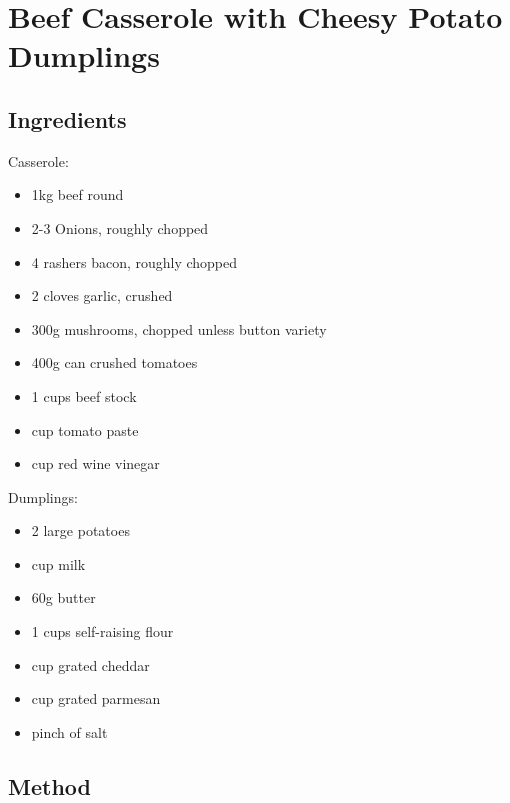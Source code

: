 \clearpage
\section{Beef Casserole with Cheesy Potato Dumplings}


\subsection{Ingredients}

Casserole:

\begin{itemize}
    \item 1kg beef round
    \item 2-3 Onions, roughly chopped
    \item 4 rashers bacon, roughly chopped
    \item 2 cloves garlic, crushed
    \item 300g mushrooms, chopped unless button variety
    \item 400g can crushed tomatoes
    \item 1 cups beef stock
    \item {} cup tomato paste
    \item {} cup red wine vinegar
\end{itemize}

Dumplings:

\begin{itemize}
    \item 2 large potatoes
    \item {} cup milk
    \item 60g butter
    \item 1 cups self-raising flour
    \item {} cup grated cheddar
    \item {} cup grated parmesan
    \item pinch of salt
\end{itemize}

\subsection{Method}

